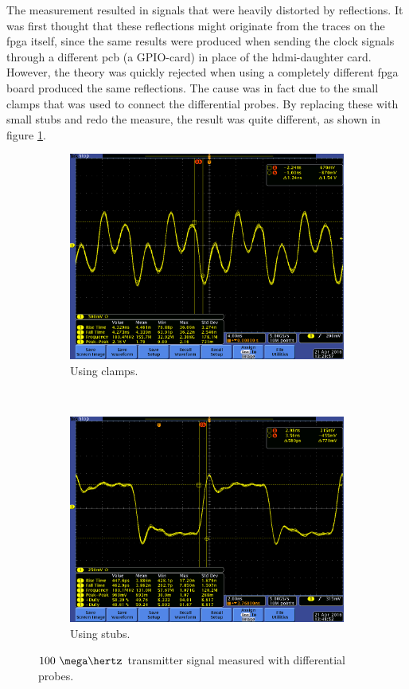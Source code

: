 \documentclass[main.tex]{subfiles}
\begin{document}
The measurement resulted in signals that were heavily distorted by reflections. It was first thought that these reflections might originate from the traces on the \gls{fpga} itself, since the same results were produced when sending the clock signals through a different \gls{pcb} (a GPIO-card) in place of the \gls{hdmi}-daughter card. However, the theory was quickly rejected when using a completely different \gls{fpga} board produced the same reflections. The cause was in fact due to the small clamps that was used to connect the differential probes. By replacing these with small stubs and redo the measure, the result was quite different, as shown in figure \ref{fig:measdiff}.

\begin{figure}
    \centering
    \begin{subfigure}{0.5\textwidth}
        \centering
        \includegraphics[width=\linewidth]{../img/hektere_oppsett_100mhz.png}
        \caption{Using clamps.}
    \end{subfigure}%
    ~~
    \begin{subfigure}{0.5\textwidth}
        \centering
        \includegraphics[width=\linewidth]{../img/stubs_oppsett_100mhz.png}
        \caption{Using stubs.}
    \end{subfigure}
    \caption{$100~\mega\hertz$ transmitter signal measured with differential probes.}
    \label{fig:measdiff}
\end{figure}
\end{document}
